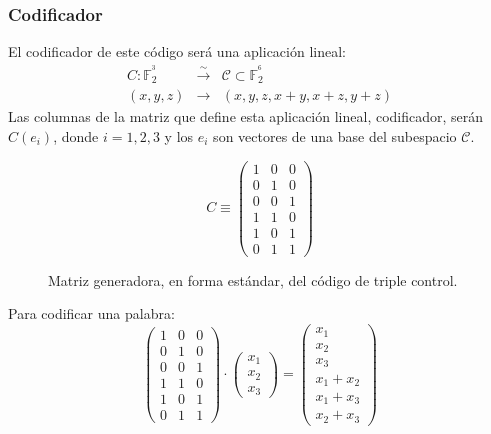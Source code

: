 \subsubsection{Codificador}

El codificador de este c\'odigo ser\'a una aplicaci\'on lineal:
\begin{eqnarray*}
C:\mathbb{F}^{^3}_2&\stackrel{\sim}\longrightarrow& \mathcal{C}\subset
\mathbb{F}^{^6}_2 \\
(x,y,z)&\longrightarrow&(x,y,z,x+y,x+z,y+z)
\end{eqnarray*}
Las columnas de la matriz que define esta aplicaci\'on lineal, codificador,
ser\'an $C(e_i)$, donde $i=1,2,3$ y los $e_i$ son vectores de una
base del subespacio $\mathcal{C}$.\\

\begin{figure}[!h]
\begin{displaymath}
C\equiv \left( \begin{array}{ccc}
1&0&0\\
0&1&0\\
0&0&1\\ 
1&1&0\\
1&0&1\\
0&1&1
\end{array} \right)
\end{displaymath}
\caption{Matriz generadora, en forma est\'andar, del c\'odigo de triple 
control.}
\end{figure}
%
Para codificar una palabra:
\begin{displaymath}
\left( \begin{array}{ccc}
1&0&0\\
0&1&0\\
0&0&1\\
1&1&0\\
1&0&1\\
0&1&1
\end{array} \right)  \cdot
\left( \begin{array}{c}
x_1\\
x_2\\
x_3
\end{array} \right) =
\left( \begin{array}{c}
x_1\\
x_2\\
x_3\\
x_1+x_2\\
x_1+x_3\\
x_2+x_3
\end{array} \right)
\end{displaymath}

